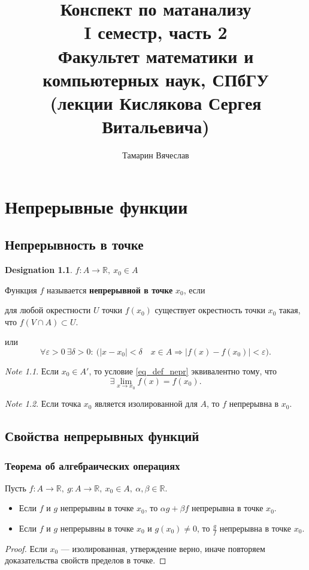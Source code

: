 \documentclass[11pt]{book}
\title{Конспект по матанализу\\I семестр, часть 2\\
    Факультет математики и компьютерных наук, СПбГУ\\
(лекции Кислякова Сергея Витальевича)}
\author{Тамарин Вячеслав}
\newcommand{\R}{\mathbb{R}}
\theoremstyle{definition}
\theoremstyle{plain}
\theoremstyle{plain}
\theoremstyle{definition}
\newtheorem*{name}{Designation}
\theoremstyle{remark}
\newtheorem*{note}{Note}
\begin{document}
\maketitle
\tableofcontents


\chapter{Непрерывные функции}
\section{Непрерывность в точке}
\begin{name}
    $ f: A \to  \R, ~ x_0 \in  A$
\end{name}
\begin{defn}
    Функция $ f$ называется {\bf непрерывной в точке} $ x_0$, если
    \begin{description}
	\item
	    для любой окрестности $ U$ точки  $ f(x_0)$ существует окрестность точки $ x_0$ такая, что $ f(V \cap A) \subset U$.
	\item или
	    \begin{equation}\label{eq_def_nepr}
		\forall \varepsilon >0 ~ \exists \delta >0: ~ \bigl( |x-x_0| < \delta \quad x \in A \Longrightarrow  |f(x) - f(x_0)| < \varepsilon \bigr).
	    \end{equation}
    \end{description}
\end{defn}
\begin{note}
    Если  $ x_0 \in A'$, то условие \ref{eq_def_nepr} эквивалентно тому, что \[
	\exists \lim_{x \to  x_0} f(x) = f(x_0)
    .\]
\end{note}
\begin{note}
    Если точка $ x_0$ является изолированной для $ A$, то  $ f$ непрерывна в $ x_0$.
\end{note}
\section{Свойства непрерывных функций}
\subsection{Теорема об алгебраических операциях}
\begin{thm}
    Пусть $ f: A \to  \R, ~ g : A \to \R, ~ x_0 \in A, ~ \alpha , \beta \in \R$.
    \begin{itemize}
	\item Если $ f$ и  $ g$ непрерывны в точке  $ x_0$, то $ \alpha g + \beta f$ непрерывна в точке $ x_0$.
	\item     Если $ f$ и  $ g$ непрерывны в точке  $ x_0$ и $ g(x_0) \ne 0$, то $\frac{g}{f}$ непрерывна в точке $ x_0$.
    \end{itemize}
\end{thm}
\begin{proof}
    Если $ x_0$ --- изолированная, утверждение верно, иначе повторяем доказательства свойств пределов в точке.
\end{proof}
\end{document}
